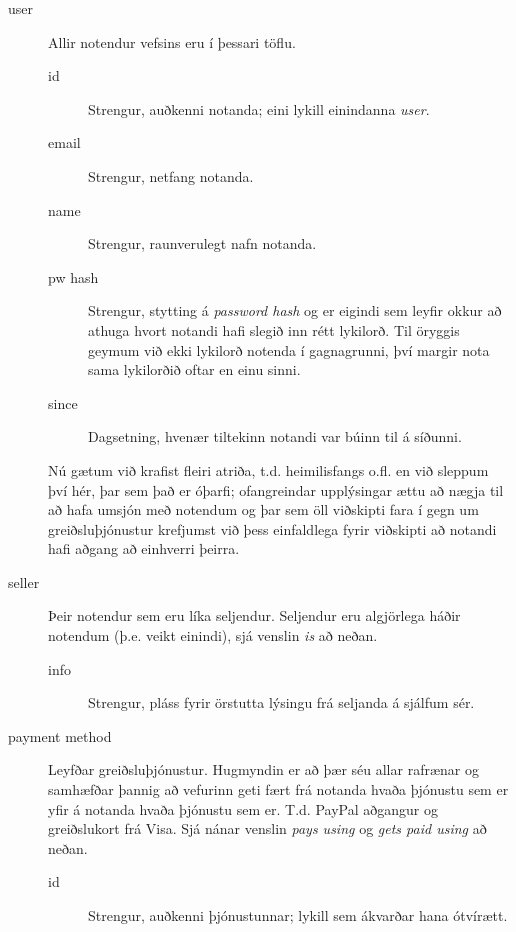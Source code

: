 \documentclass[a4paper,icelandic]{article}
\theoremstyle{definition} \newtheorem{skilgr}{Skilgreining}
\theoremstyle{plain}      \newtheorem{setn}{Setning}
\theoremstyle{remark}     \newtheorem*{lausn}{Lausn}
\begin{document}
\begin{description}
    \item[user] Allir notendur vefsins eru í þessari töflu.
        \begin{description}
            \item[id] Strengur, auðkenni notanda; eini lykill einindanna
                \emph{user}.
            \item[email] Strengur, netfang notanda.
            \item[name] Strengur, raunverulegt nafn notanda.
            \item[pw hash] Strengur, stytting á \emph{password hash} og er
                eigindi sem leyfir okkur að athuga hvort notandi hafi slegið inn
                rétt lykilorð. Til öryggis geymum við ekki lykilorð
                notenda í gagnagrunni, því margir nota sama lykilorðið
                oftar en einu sinni.
            \item[since] Dagsetning, hvenær tiltekinn notandi var búinn til á
                síðunni.
        \end{description}
        Nú gætum við krafist fleiri atriða, t.d. heimilisfangs o.fl. en við
        sleppum því hér, þar sem það er óþarfi; ofangreindar upplýsingar ættu að
        nægja til að hafa umsjón með notendum og þar sem öll viðskipti fara í
        gegn um greiðsluþjónustur krefjumst við þess einfaldlega fyrir viðskipti
        að notandi hafi aðgang að einhverri þeirra.
    \item[seller] Þeir notendur sem eru líka seljendur. Seljendur eru algjörlega
        háðir notendum (þ.e. veikt einindi), sjá venslin \emph{is} að neðan.
        \begin{description}
            \item[info] Strengur, pláss fyrir örstutta lýsingu frá seljanda á
                sjálfum sér.
        \end{description}
    \item[payment method] Leyfðar greiðsluþjónustur. Hugmyndin er að þær séu
        allar rafrænar og samhæfðar þannig að vefurinn geti fært frá notanda
        hvaða þjónustu sem er yfir á notanda hvaða þjónustu sem er. T.d.  PayPal
        aðgangur og greiðslukort frá Visa. Sjá nánar venslin \emph{pays using}
        og \emph{gets paid using} að neðan.
        \begin{description}
            \item[id] Strengur, auðkenni þjónustunnar; lykill sem ákvarðar hana
                ótvírætt.

\end{description}
\end{description}
\end{document}
